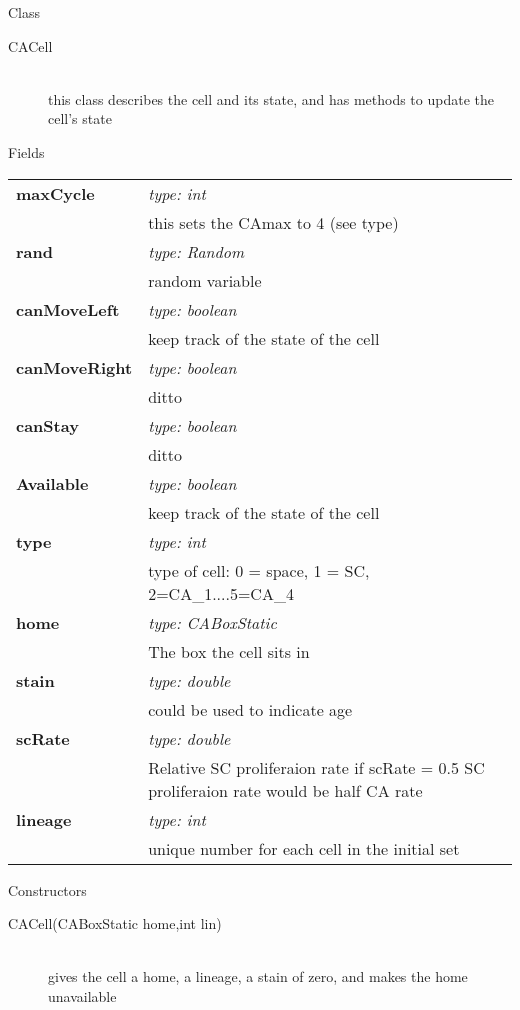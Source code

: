 \documentclass[11pt,a4paper]{article}
\newcommand \bt{\begin{longtable}{p{0.25\textwidth}p{0.74\textwidth}}}
\newcommand \et{\end{longtable}}
\newcommand{\hs}{\hspace{0.5cm}}
\newenvironment{di}
{\begin{flushright}
\begin{minipage}{0.95\textwidth}
\begin{description}
}
{\end{description}
\end{minipage}
\end{flushright}
}
\begin{document}
\noindent
\colorbox{classbg}{\parbox{1.0\textwidth}{\Large{Class}}}
\begin{di}
\item[\large{CACell}]\qquad\\
this class describes the cell and its state, and has methods to update the cell's state
\end{di}
\colorbox{fieldbg}{\parbox{1.0\textwidth}{\Large{Fields}}}\vspace{0.5cm}
\bt
\hs \textbf{maxCycle} & \emph{type: int}\\
& \hs this sets the CAmax to 4 (see type)\\
\hs \textbf{rand} & \emph{type: Random}\\
& \hs random variable\\
\hs \textbf{canMoveLeft} & \emph{type: boolean}\\
& \hs keep track of the state of the cell\\
\hs \textbf{canMoveRight} & \emph{type: boolean}\\
& \hs ditto\\
\hs \textbf{canStay} & \emph{type: boolean}\\
& \hs ditto\\
\hs \textbf{Available} & \emph{type: boolean}\\
& \hs keep track of the state of the cell\\
\hs \textbf{type} & \emph{type: int}\\
& \hs type of cell: 0 = space, 1 = SC, 2=CA\_1....5=CA\_4\\
\hs \textbf{home} & \emph{type: CABoxStatic}\\
& \hs The box the cell sits in\\
\hs \textbf{stain} & \emph{type: double}\\
& \hs could be used to indicate age\\
\hs \textbf{scRate} & \emph{type: double}\\
& \hs Relative SC proliferaion rate if scRate = 0.5 SC proliferaion rate would be half CA rate\\
\hs \textbf{lineage} & \emph{type: int}\\
& \hs unique number for each cell in the initial set\\
\et
\noindent\colorbox{conbg}{\parbox{1.0\textwidth}{\Large{Constructors}}}
\begin{di}
\item[{CACell(CABoxStatic home,int lin)}]\qquad\\
gives the cell a home, a lineage, a stain of zero, and makes the home unavailable
\end{di}
\end{document}
